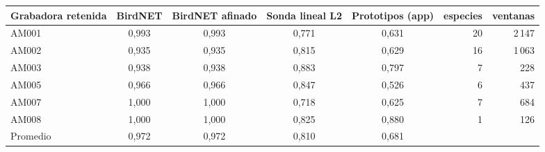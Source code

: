 \begin{tabular}{lccccrr}
\toprule
Grabadora retenida & BirdNET & BirdNET afinado & Sonda lineal L2 & Prototipos (app) & especies & ventanas\\
\midrule
AM001 & 0{,}993 & 0{,}993 & 0{,}771 & 0{,}631 & 20 & 2\,147\\
AM002 & 0{,}935 & 0{,}935 & 0{,}815 & 0{,}629 & 16 & 1\,063\\
AM003 & 0{,}938 & 0{,}938 & 0{,}883 & 0{,}797 & 7 & 228\\
AM005 & 0{,}966 & 0{,}966 & 0{,}847 & 0{,}526 & 6 & 437\\
AM007 & 1{,}000 & 1{,}000 & 0{,}718 & 0{,}625 & 7 & 684\\
AM008 & 1{,}000 & 1{,}000 & 0{,}825 & 0{,}880 & 1 & 126\\
\midrule
Promedio & 0{,}972 & 0{,}972 & 0{,}810 & 0{,}681 & & \\
\bottomrule
\end{tabular}
